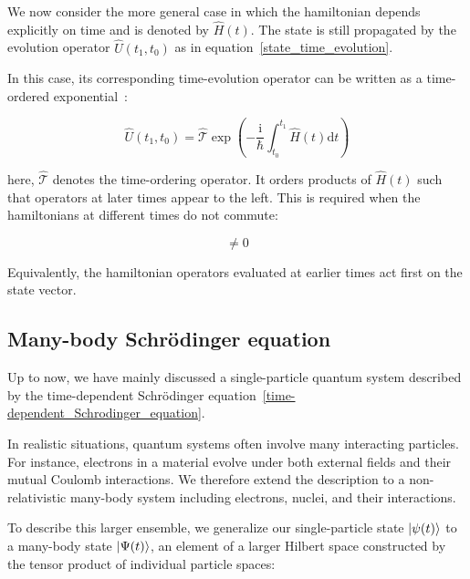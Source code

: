 
We now consider the more general case in which the hamiltonian depends explicitly on time and is denoted by $\hat{H}(t)$.
The state is still propagated by the evolution operator $\hat{U}(t_1,t_0)$ as in equation~\eqref{state_time_evolution}.

In this case, its corresponding time-evolution operator can be written as a time-ordered exponential~\cite{sakurai2020modern}:

\begin{equation}
    \hat{U}(t_1,t_0)=\hat{\mathcal{T}}\exp\left(-\frac{\mathrm{i}}{\hbar}\int_{t_0}^{t_1}\hat{H}(t)\mathrm{d}t\right)
\label{time-ordering_operator}
\end{equation}

here, $\hat{\mathcal{T}}$ denotes the time-ordering operator.
It orders products of $\hat{H}(t)$ such that operators at later times appear to the left.
This is required when the hamiltonians at different times do not commute:

\begin{equation}
    [\hat{H}(t),\hat{H}(t')]\neq 0
\label{hamiltonian_noncommutativity}
\end{equation}

Equivalently, the hamiltonian operators evaluated at earlier times act first on the state vector.

\subsection{Many-body Schrödinger equation}
\label{sec:manybody_schrodinger_equation}

Up to now, we have mainly discussed a single-particle quantum system described by the time-dependent Schrödinger equation~\eqref{time-dependent_Schrodinger_equation}.

In realistic situations, quantum systems often involve many interacting particles.
For instance, electrons in a material evolve under both external fields and their mutual Coulomb interactions.
We therefore extend the description to a non-relativistic many-body system including electrons, nuclei, and their interactions.

To describe this larger ensemble, we generalize our single-particle state $\ket{\psi(t)}$ to a many-body state $\ket{\Psi(t)}$, an element of a larger Hilbert space constructed by the tensor product of individual particle spaces:

